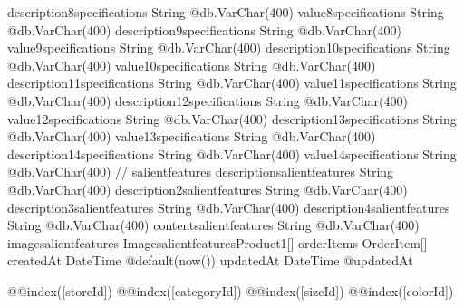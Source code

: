 {  description8specifications   String                         @db.VarChar(400)
  value8specifications         String                         @db.VarChar(400)
  description9specifications   String                         @db.VarChar(400)
  value9specifications         String                         @db.VarChar(400)
  description10specifications  String                         @db.VarChar(400)
  value10specifications        String                         @db.VarChar(400)
  description11specifications  String                         @db.VarChar(400)
  value11specifications        String                         @db.VarChar(400)
  description12specifications  String                         @db.VarChar(400)
  value12specifications        String                         @db.VarChar(400)
  description13specifications  String                         @db.VarChar(400)
  value13specifications        String                         @db.VarChar(400)
  description14specifications  String                         @db.VarChar(400)
  value14specifications        String                         @db.VarChar(400)
  // salientfeatures
  descriptionsalientfeatures   String                         @db.VarChar(400)
  description2salientfeatures  String                         @db.VarChar(400)
  description3salientfeatures  String                         @db.VarChar(400)
  description4salientfeatures  String                         @db.VarChar(400)
  contentsalientfeatures       String                         @db.VarChar(400)
  imagesalientfeatures ImagesalientfeaturesProduct1[]
  orderItems                   OrderItem[]
  createdAt                    DateTime                       @default(now())
  updatedAt                    DateTime                       @updatedAt

  @@index([storeId])
  @@index([categoryId])
  @@index([sizeId])
  @@index([colorId])
}

